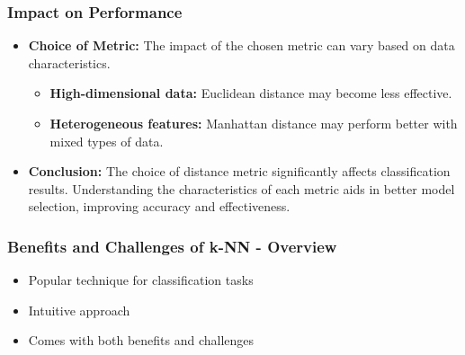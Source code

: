 \documentclass[aspectratio=169]{beamer}
\begin{document}
\begin{frame}[fragile]
  \frametitle{Impact on Performance}
  
  \begin{itemize}
    \item \textbf{Choice of Metric:} The impact of the chosen metric can vary based on data characteristics.
    \begin{itemize}
      \item \textbf{High-dimensional data:} Euclidean distance may become less effective.
      \item \textbf{Heterogeneous features:} Manhattan distance may perform better with mixed types of data.
    \end{itemize}
    
    \item \textbf{Conclusion:} The choice of distance metric significantly affects classification results. Understanding the characteristics of each metric aids in better model selection, improving accuracy and effectiveness.
  \end{itemize}
\end{frame}

\begin{frame}[fragile]
  \frametitle{Benefits and Challenges of k-NN - Overview}
  
  \begin{itemize}
      \item Popular technique for classification tasks
      \item Intuitive approach
      \item Comes with both benefits and challenges
  \end{itemize}
\end{frame}
\end{document}
